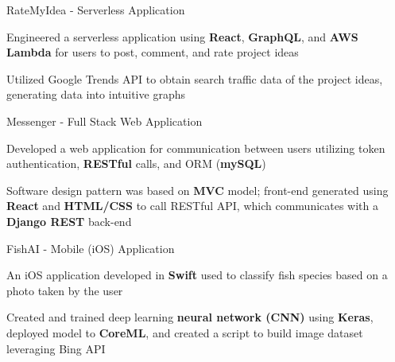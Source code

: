 \begin{siderulesProj}
\par\addvspace{-1.2ex}
\begin{cventriesproject}
  \cventryproject
  {RateMyIdea - Serverless Application}
  {
    \begin{cvskillitems}
      \item {Engineered a serverless application using \textbf{React}, \textbf{GraphQL}, and \textbf{AWS Lambda} for users to post, comment, and rate project ideas }
      \item {Utilized Google Trends API to obtain search traffic data of the project ideas, generating data into intuitive graphs }
    \end{cvskillitems}
  }
  \cventryproject
    {Messenger - Full Stack Web Application}
    {
      \begin{cvskillitems}
        \item {Developed a web application for communication between users utilizing token authentication, \textbf{RESTful} calls, and ORM (\textbf{mySQL})}
        \item {Software design pattern was based on \textbf{MVC} model; front-end generated using \textbf{React} and \textbf{HTML/CSS} to call RESTful API, which communicates with a \textbf{Django REST} back-end}
      \end{cvskillitems}
    }
  \cventryproject
    {FishAI - Mobile (iOS) Application}
    {
      \begin{cvskillitems}
        \item {An iOS application developed in \textbf{Swift} used to classify fish species based on a photo taken by the user}
        \item {Created and trained deep learning \textbf{neural network (CNN)} using \textbf{Keras}, deployed model to \textbf{CoreML}, and created a script to build image dataset leveraging Bing API}
      \end{cvskillitems}
    }
\end{cventriesproject}
\end{siderulesProj}
